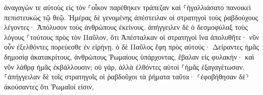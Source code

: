 \documentclass{openreader}
\begin{document}
ἀναγαγών τε αὐτοὺς εἰς τὸν ⸀οἶκον παρέθηκεν τράπεζαν καὶ ⸀ἠγαλλιάσατο πανοικεὶ πεπιστευκὼς τῷ θεῷ. 
Ἡμέρας δὲ γενομένης ἀπέστειλαν οἱ στρατηγοὶ τοὺς ῥαβδούχους λέγοντες· Ἀπόλυσον τοὺς ἀνθρώπους ἐκείνους. 
ἀπήγγειλεν δὲ ὁ δεσμοφύλαξ τοὺς λόγους ⸀τούτους πρὸς τὸν Παῦλον, ὅτι Ἀπέσταλκαν οἱ στρατηγοὶ ἵνα ἀπολυθῆτε· νῦν οὖν ἐξελθόντες πορεύεσθε ἐν εἰρήνῃ. 
ὁ δὲ Παῦλος ἔφη πρὸς αὐτούς· Δείραντες ἡμᾶς δημοσίᾳ ἀκατακρίτους, ἀνθρώπους Ῥωμαίους ὑπάρχοντας, ἔβαλαν εἰς φυλακήν· καὶ νῦν λάθρᾳ ἡμᾶς ἐκβάλλουσιν; οὐ γάρ, ἀλλὰ ἐλθόντες αὐτοὶ ⸀ἡμᾶς ἐξαγαγέτωσαν. 
⸀ἀπήγγειλαν δὲ τοῖς στρατηγοῖς οἱ ῥαβδοῦχοι τὰ ῥήματα ταῦτα· ⸂ἐφοβήθησαν δὲ⸃ ἀκούσαντες ὅτι Ῥωμαῖοί εἰσιν, 
\end{document}
